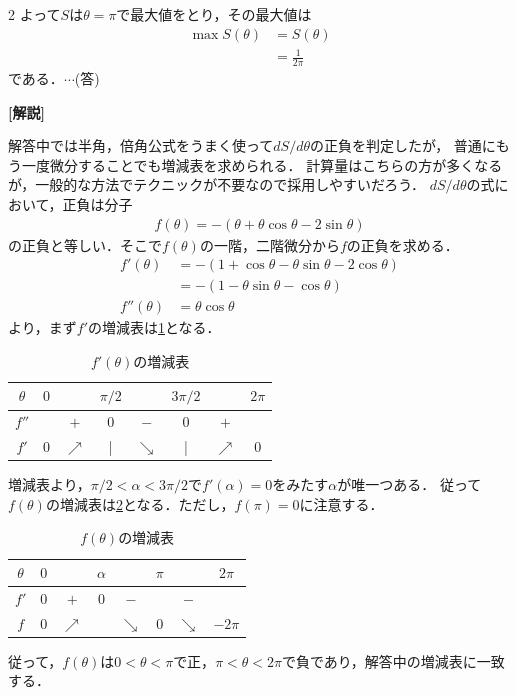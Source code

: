 \documentclass[../../../../main.tex]{subfiles}
\begin{document}
\begin{multicols}{2}
  よって$S$は$\theta=\pi$で最大値をとり，その最大値は
  \begin{align*}
    \max S(\theta)
     & = S(\theta)      \\
     & = \frac{1}{2\pi}
  \end{align*}
  である．$\cdots$(答)
  \vspace{10pt}

  {\bf[解説]}


  解答中では半角，倍角公式をうまく使って$dS/d\theta$の正負を判定したが，
  普通にもう一度微分することでも増減表を求められる．
  計算量はこちらの方が多くなるが，一般的な方法でテクニックが不要なので採用しやすいだろう．
  $dS/d\theta$の式において，正負は分子
  \begin{align*}
    f(\theta) = -(\theta + \theta\cos\theta - 2\sin\theta)
  \end{align*}
  の正負と等しい．そこで$f(\theta)$の一階，二階微分から$f$の正負を求める．
  \begin{align*}
    f'(\theta)
     & = -(1+\cos\theta - \theta\sin\theta - 2\cos\theta) \\
     & = -(1 - \theta\sin\theta - \cos\theta)             \\
    f''(\theta)
     & = \theta\cos\theta
  \end{align*}
  より，まず$f'$の増減表は\cref{1994-5:table:2}となる．

  \begin{table}[H]
    \centering
    \caption{$f'(\theta)$の増減表}
    \label{1994-5:table:2}
    \begin{tabular}{|c||c|c|c|c|c|c|c|}
      \hline
      $\theta$ & $0$ &            & $\pi/2$ &            & $3\pi/2$ &            & $2\pi$ \\
      \hline
      $f''$    &     & $+$        & $0$     & $-$        & $0$      & $+$        &        \\
      \hline
      $f'$     & $0$ & $\nearrow$ & |       & $\searrow$ & |        & $\nearrow$ & $0$    \\
      \hline
    \end{tabular}
  \end{table}

  増減表より，$\pi/2 < \alpha < 3\pi/2$で$f'(\alpha)=0$をみたす$\alpha$が唯一つある．
  従って$f(\theta)$の増減表は\cref{1994-5:table:3}となる．ただし，$f(\pi)=0$に注意する．

  \begin{table}[H]
    \centering
    \caption{$f(\theta)$の増減表}
    \label{1994-5:table:3}
    \begin{tabular}{|c||c|c|c|c|c|c|c|}
      \hline
      $\theta$ & $0$ &            & $\alpha$ &            & $\pi$ &            & $2\pi$  \\
      \hline
      $f'$     & $0$ & $+$        & $0$      & $-$        &       & $-$        &         \\
      \hline
      $f$      & $0$ & $\nearrow$ &          & $\searrow$ & $0$   & $\searrow$ & $-2\pi$ \\
      \hline
    \end{tabular}
  \end{table}

  従って，$f(\theta)$は$0<\theta<\pi$で正，$\pi<\theta<2\pi$で負であり，解答中の増減表に一致する．

  \newpage
\end{multicols}
\end{document}

